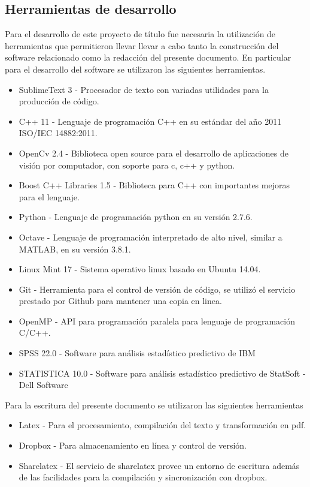 \subsection{Herramientas de desarrollo}

Para el desarrollo de este proyecto de título fue necesaria la utilización de herramientas que permitieron llevar llevar a cabo tanto la construcción del software relacionado como la redacción del presente documento.
En particular para el desarrollo del software se utilizaron las siguientes herramientas.

\begin{itemize}
  \item SublimeText 3 - Procesador de texto con variadas utilidades para la producción de código.
  \item C++ 11 - Lenguaje de programación C++ en su estándar del año 2011 ISO/IEC 14882:2011.
  \item OpenCv 2.4 - Biblioteca open source para el desarrollo de aplicaciones de visión por computador, con soporte para c, c++ y python.
  \item Boost C++ Libraries 1.5 - Biblioteca para C++ con importantes mejoras para el lenguaje.
  \item Python - Lenguaje de programación python en su versión 2.7.6.
  \item Octave - Lenguaje de programación interpretado de alto nivel, similar a MATLAB, en su versión 3.8.1.
  \item Linux Mint 17 - Sistema operativo linux basado en Ubuntu 14.04.
  \item Git - Herramienta para el control de versión de código, se utilizó el servicio prestado por Github para mantener una copia en linea.
  \item OpenMP - API para programación paralela para lenguaje de programación C/C++.
  \item SPSS 22.0 - Software para análisis estadístico predictivo de IBM 
  \item STATISTICA 10.0 - Software para análisis estadístico predictivo de StatSoft - Dell Software
\end{itemize}

Para la escritura del presente documento se utilizaron las siguientes herramientas

\begin{itemize}
\item Latex - Para el procesamiento, compilación del texto y transformación en pdf.
\item Dropbox - Para almacenamiento en línea y control de versión.
\item Sharelatex - El servicio de sharelatex provee un entorno de escritura además de las facilidades para la compilación y sincronización con dropbox.
\end{itemize}


